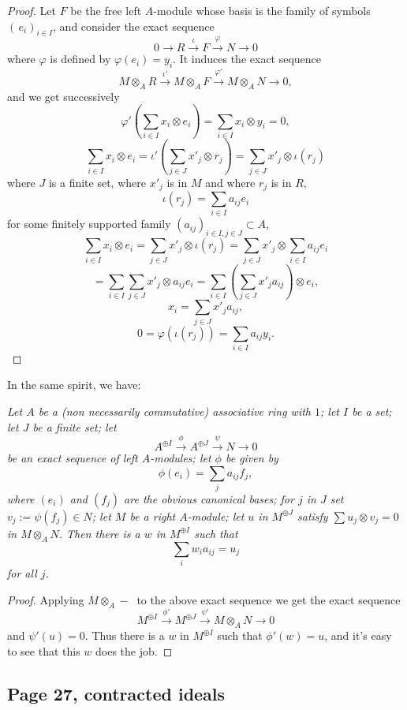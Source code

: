 \documentclass[parskip=half,fontsize=12pt]{scrartcl}%
\begin{document}
\begin{proof} 
Let $F$ be the free left $A$-module whose basis is the family of symbols $(\,e_i)_{i\in I}$, and consider the exact sequence 
$$
0\to R\xrightarrow\iota F\xrightarrow\varphi N\to 0
$$ 
where $\varphi$ is defined by $\varphi(e_i)=y_i$. It induces the exact sequence 
$$
M\otimes_AR\xrightarrow{\iota'}M\otimes_AF\xrightarrow{\varphi'}M\otimes_AN\to 0,
$$ 
and we get successively
$$
\varphi'\left(\sum_{i\in I}x_i\otimes e_i\right)=\sum_{i\in I}x_i\otimes y_i=0,
$$ 
$$
\sum_{i\in I}x_i\otimes e_i=\iota'\left(\sum_{j\in J}x'_j\otimes r_j\right)=\sum_{j\in J}x'_j\otimes\iota(r_j)
$$ 
where $J$ is a finite set, where $x'_j$ is in $M$ and where $r_j$ is in $R$, 
$$
\iota(r_j)=\sum_{i\in I}a_{ij}e_i
$$ 
for some finitely supported family $(a_{ij})_{i\in I,j\in J}\subset A$, 
$$
\sum_{i\in I}x_i\otimes e_i=\sum_{j\in J}x'_j\otimes\iota(r_j)=\sum_{j\in J} x'_j\otimes\sum_{i\in I}a_{ij}e_i
$$
$$
=\sum_{i\in I}\sum_{j\in J} x'_j\otimes a_{ij}e_i=\sum_{i\in I}\left(\sum_{j\in J}x'_ja_{ij}\right)\otimes e_i,
$$ 
$$
x_i=\sum_{j\in J}x'_ja_{ij},
$$ 
$$
0=\varphi(\iota(r_j))=\sum_{i\in I}a_{ij}y_i.
$$ 
\end{proof}

In the same spirit, we have:

\emph{Let $A$ be a (non necessarily commutative) associative ring with $1$; let $I$ be a set; let $J$ be a finite set; let 
$$
A^{\oplus I}\xrightarrow\phi A^{\oplus J}\xrightarrow\psi N\to0
$$ 
be an exact sequence of left $A$-modules; let $\phi$ be given by 
$$
\phi(e_i)=\sum_ja_{ij}f_j,
$$ 
where $(e_i)$ and $(f_j)$ are the obvious canonical bases; for $j$ in $J$ set $v_j:=\psi(f_j)\in N$; let $M$ be a right $A$-module; let $u$ in $M^{\oplus J}$ satisfy $\sum u_j\otimes v_j=0$ in $M\otimes_AN$. Then there is a $w$ in $M^{\oplus I}$ such that 
$$
\sum_iw_ia_{ij}=u_j
$$ 
for all $j$.}

\begin{proof} 
Applying $M\otimes_A-\ $ to the above exact sequence we get the exact sequence 
$$
M^{\oplus I}\xrightarrow{\phi'}M^{\oplus J}\xrightarrow{\psi'}M\otimes_AN\to0
$$ 
and $\psi'(u)=0$. Thus there is a $w$ in $M^{\oplus I}$ such that $\phi'(w)=u$, and it's easy to see that this $w$ does the job. 
\end{proof}

\subsection{Page 27, contracted ideals}\label{27}%
\end{document}
